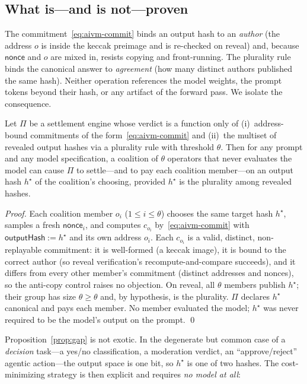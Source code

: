 \subsection{What is---and is not---proven}

The commitment~\eqref{eq:aivm-commit} binds an output hash to an \emph{author}
(the address $o$ is inside the keccak preimage and is re-checked on reveal) and,
because $\mathsf{nonce}$ and $o$ are mixed in, resists copying and front-running.
The plurality rule binds the canonical answer to \emph{agreement} (how many
distinct authors published the same hash). Neither operation references the model
weights, the prompt tokens beyond their hash, or any artifact of the forward pass.
We isolate the consequence.

\begin{proposition}
\label{prop:gap}
Let $\Pi$ be a settlement engine whose verdict is a function only of
(i)~address-bound commitments of the form~\eqref{eq:aivm-commit} and
(ii)~the multiset of revealed output hashes via a plurality rule with threshold
$\theta$. Then for any prompt and any model specification, a coalition of
$\theta$ operators that never evaluates the model can cause $\Pi$ to settle---and
to pay each coalition member---on an output hash $h^\star$ of the coalition's
choosing, provided $h^\star$ is the plurality among revealed hashes.
\end{proposition}

\begin{proof}
Each coalition member $o_i$ ($1 \le i \le \theta$) chooses the same target hash
$h^\star$, samples a fresh $\mathsf{nonce}_i$, and computes
$c_{o_i}$ by~\eqref{eq:aivm-commit} with $\mathsf{outputHash} := h^\star$ and its
own address $o_i$. Each $c_{o_i}$ is a valid, distinct, non-replayable commitment:
it is well-formed (a keccak image), it is bound to the correct author (so reveal
verification's recompute-and-compare succeeds), and it differs from every other
member's commitment (distinct addresses and nonces), so the anti-copy control
raises no objection. On reveal, all $\theta$ members publish $h^\star$; their
group has size $\theta \ge \theta$ and, by hypothesis, is the plurality. $\Pi$
declares $h^\star$ canonical and pays each member. No member evaluated the model;
$h^\star$ was never required to be the model's output on the prompt. \qed
\end{proof}

Proposition~\ref{prop:gap} is not exotic. In the degenerate but common case of a
\emph{decision} task---a yes/no classification, a moderation verdict, an
``approve/reject'' agentic action---the output space is one bit, so $h^\star$ is
one of two hashes. The cost-minimizing strategy is then explicit and requires
\emph{no model at all}:

